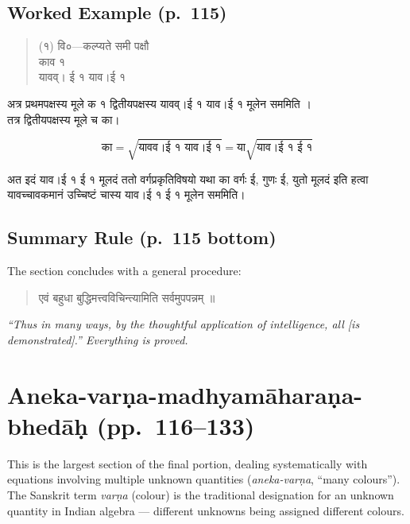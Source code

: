 \documentclass[11pt,a4paper]{article}
\newcommand{\cnote}[1]{\textcolor{notecolor}{\textit{#1}}}
\newcommand{\dev}[1]{{\devanagarifont #1}}
\newenvironment{sanskritverse}{%
  \begin{quote}
}{%
  \end{quote}
}
\begin{document}
\subsection*{Worked Example (p.\ 115)}

\begin{sanskritverse}
\dev{%
(१) वि०—कल्प्यते समी पक्षौ\\[0.3em]
\hspace*{2em} काव १\\
\hspace*{2em} यावव्। ई १ याव।ई १}
\end{sanskritverse}

\dev{%
अत्र प्रथमपक्षस्य मूले क १ द्वितीयपक्षस्य यावव्।ई १ याव।ई १ मूलेन सममिति ।\\
तत्र द्वितीयपक्षस्य मूले च का।}

$$\text{का} = \sqrt{\text{यावव।ई १ याव।ई १}} = \text{या}\sqrt{\text{याव।ई १ ई १}}$$

\dev{%
अत इदं याव।ई १ ई १ मूलदं ततो वर्गप्रकृतिविषयो यथा का वर्गः ई, गुणः ई, युतो मूलदं इति हत्वा यावच्चावकमानं उच्चिष्टं चास्य याव।ई १ ई १ मूलेन सममिति।}

\subsection*{Summary Rule (p.\ 115 bottom)}

The section concludes with a general procedure:

\begin{sanskritverse}
\dev{%
एवं बहुधा बुद्धिमत्त्वविचिन्त्यामिति सर्वमुपपन्नम् ॥}
\end{sanskritverse}

\cnote{``Thus in many ways, by the thoughtful application of intelligence, all [is demonstrated].'' Everything is proved.}

\section{Aneka-varṇa-madhyamāharaṇa-bhedāḥ (pp.\ 116--133)}
\label{sec:aneka-varna}

This is the largest section of the final portion, dealing systematically with equations involving multiple unknown quantities (\textit{aneka-varṇa}, ``many colours''). The Sanskrit term \textit{varṇa} (colour) is the traditional designation for an unknown quantity in Indian algebra --- different unknowns being assigned different colours.
\end{document}
